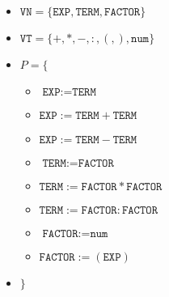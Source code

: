 \begin{itemize}[label={}]
    \item $\texttt{VN} = \{ \texttt{EXP}, \texttt{TERM}, \texttt{FACTOR}\}$
    \item $\texttt{VT} = \{+, *, -, :, (, ), \texttt{num}\}$
    \item $P = \{$
    \begin{itemize}[label={}]
        \item $\texttt{EXP} := \texttt{TERM}$
        \item $\texttt{EXP} := \texttt{TERM} + \texttt{TERM}$
        \item $\texttt{EXP} := \texttt{TERM} - \texttt{TERM}$
        \item $\texttt{TERM} := \texttt{FACTOR}$
        \item $\texttt{TERM} := \texttt{FACTOR} * \texttt{FACTOR}$
        \item $\texttt{TERM} := \texttt{FACTOR} : \texttt{FACTOR}$
        \item $\texttt{FACTOR} := \texttt{num}$
        \item $\texttt{FACTOR} := ( \texttt{EXP})$
    \end{itemize}
    \item $\}$
\end{itemize}
\setlist{}






























